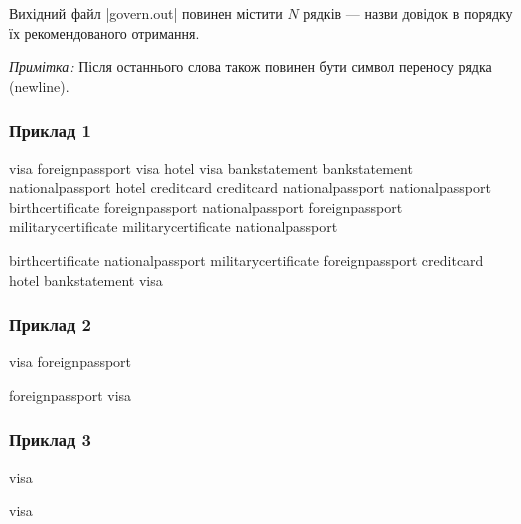 \documentclass[12pt,a4paper]{article}
\begin{document}
Вихідний файл |govern.out| повинен містити \(N\) рядків --- назви довідок в порядку їх рекомендованого отримання.

\emph{Примітка:} Після останнього слова також повинен бути символ переносу рядка (newline).


\pagebreak


\subsubsection*{Приклад 1}

\textbf{}

\begin{codeblock}
visa foreignpassport
visa hotel
visa bankstatement
bankstatement nationalpassport
hotel creditcard
creditcard nationalpassport
nationalpassport birthcertificate
foreignpassport nationalpassport
foreignpassport militarycertificate
militarycertificate nationalpassport
\end{codeblock}

\textbf{}

\begin{codeblock}
birthcertificate
nationalpassport
militarycertificate
foreignpassport
creditcard
hotel
bankstatement
visa
\end{codeblock}


\subsubsection*{Приклад 2}

\textbf{}

\begin{codeblock}
visa foreignpassport
\end{codeblock}

\textbf{}

\begin{codeblock}
foreignpassport
visa
\end{codeblock}


\subsubsection*{Приклад 3}

\textbf{}

\begin{codeblock}
visa
\end{codeblock}

\textbf{}

\begin{codeblock}
visa
\end{codeblock}
\end{document}
